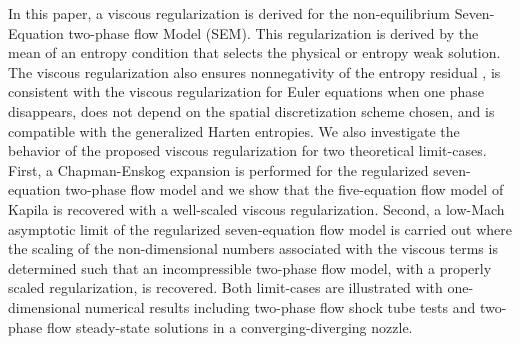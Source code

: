 In this paper, a viscous regularization is derived for the non-equilibrium Seven-Equation two-phase flow Model (SEM). 
This regularization is derived by the mean of an entropy condition that selects the physical or entropy weak solution.
 
The viscous regularization also ensures nonnegativity of the entropy residual  , is consistent with the viscous regularization for Euler equations 
when one phase disappears, does not depend on the spatial discretization scheme chosen, and is compatible with the generalized Harten entropies. 
We also investigate the behavior of the proposed viscous regularization for two theoretical limit-cases. 
First, a Chapman-Enskog expansion is performed for the regularized seven-equation two-phase flow model and we show that the five-equation flow 
model of Kapila is recovered with a well-scaled viscous regularization. 
Second, a low-Mach asymptotic limit of the regularized seven-equation flow model is carried out where the scaling of the non-dimensional numbers
associated with the viscous terms is determined such that an incompressible two-phase flow model, with a properly scaled regularization, is recovered. 
Both limit-cases are illustrated with one-dimensional numerical results including two-phase flow shock tube tests 
and two-phase flow steady-state solutions in a converging-diverging nozzle.